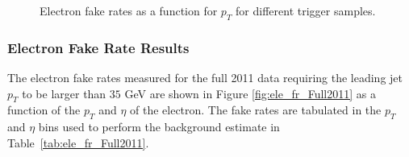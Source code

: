 \begin{figure}[!htbp]
\begin{center}
\caption{Electron fake rates as a function for $p_{T}$ for different trigger samples.}
\label{fig:ele_fr_triggerBiasCheck}
\end{center}
\end{figure}



\subsubsection{Electron Fake Rate Results}

The electron fake rates measured for the full 2011 data requiring the leading jet $p_{T}$ to be 
larger than $35$ GeV are shown in Figure \ref{fig:ele_fr_Full2011} as a function of the $p_{T}$ 
and $\eta$ of the electron. The fake rates are tabulated in the 
$p_{T}$ and $\eta$ bins used to perform the background estimate in Table~\ref{tab:ele_fr_Full2011}.


